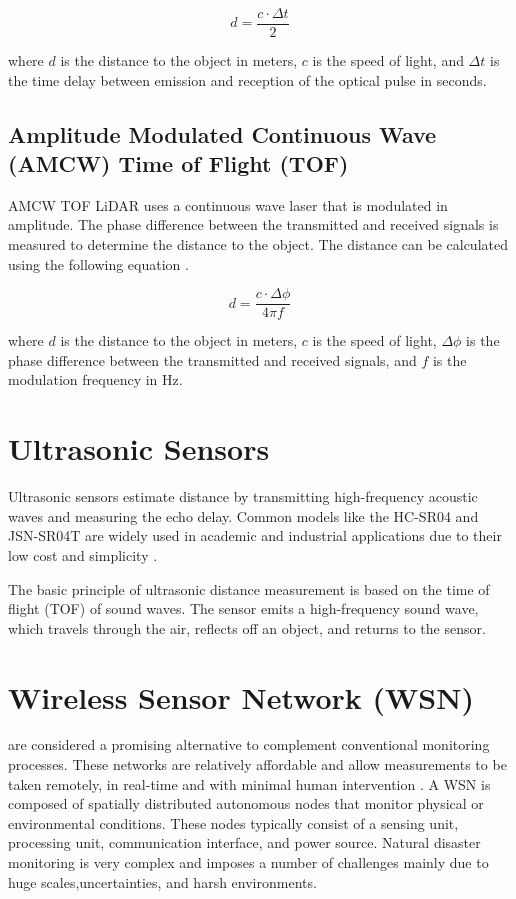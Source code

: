 \begin{equation}
    d = \frac{c \cdot \Delta t}{2}
\end{equation}

where \(d\) is the distance to the object in meters, \(c\) is the speed of light, and \( \Delta t\) is the time delay between emission and reception of the optical pulse in seconds.

\subsection{Amplitude Modulated Continuous Wave (AMCW) Time of Flight (TOF)}
AMCW TOF LiDAR uses a continuous wave laser that is modulated in amplitude. The phase difference between the transmitted and received signals is measured to determine the distance to the object. The distance can be calculated using the following equation \cite{li_2022_a}.

\begin{equation}
    d = \frac{c \cdot \Delta \phi}{4\pi f}
\end{equation}

where \(d\) is the distance to the object in meters, \(c\) is the speed of light, \(\Delta \phi\) is the phase difference between the transmitted and received signals, and \(f\) is the modulation frequency in Hz.

\section{Ultrasonic Sensors}

Ultrasonic sensors estimate distance by transmitting high-frequency acoustic waves and measuring the echo delay. Common models like the HC-SR04 and JSN-SR04T are widely used in academic and industrial applications due to their low cost and simplicity \cite{bresnahan_2023_a,akhileshnagpure_2022_water,mohammadrezamasoudimoghaddam_2024_a}.

The basic principle of ultrasonic distance measurement is based on the time of flight (\gls{TOF}) of sound waves. The sensor emits a high-frequency sound wave, which travels through the air, reflects off an object, and returns to the sensor.

\section{Wireless Sensor Network (WSN)}

 are considered a promising alternative to complement conventional monitoring processes. These networks are relatively affordable and allow measurements to be taken remotely, in real-time and with minimal human intervention \cite{pule_2017_wireless}. A \gls{WSN} is composed of spatially distributed autonomous nodes that monitor physical or environmental conditions. These nodes typically consist of a sensing unit, processing unit, communication interface, and power source. Natural disaster monitoring is very complex and imposes a number of challenges mainly due to huge scales,uncertainties, and harsh environments.

